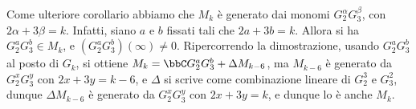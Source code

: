 Come ulteriore corollario abbiamo che $M_k$ è generato dai monomi $G_2^\alpha G_3^\beta$, con $2\alpha+3\beta=k$.
Infatti, siano $a$ e $b$ fissati tali che $2a+3b=k$.
Allora si ha $G_2^a G_3^b\in M_k$, e $(G_2^a G_3^b)(\infty)\neq0$.
Ripercorrendo la dimostrazione, usando $G_2^a G_3^b$ al posto di $G_k$, si ottiene $M_k=\bbC G_2^a G_3^b + \Delta M_{k-6}$, ma $M_{k-6}$ è generato da $G_2^x G_3^y$ con $2x+3y=k-6$, e $\Delta$ si scrive come combinazione lineare di $G_2^3$ e $G_3^2$, dunque $\Delta M_{k-6}$ è generato da $G_2^x G_3^y$ con $2x+3y=k$, e dunque lo è anche $M_k$.

